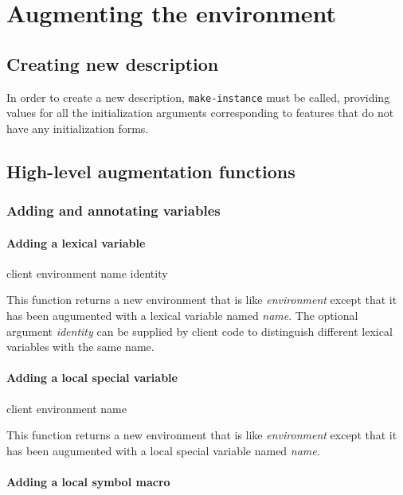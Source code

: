 \chapter{Augmenting the environment}

\section{Creating new description}

In order to create a new description, \texttt{make-instance}
must be called, providing values for all the initialization arguments
corresponding to features that do not have any initialization forms.


\section{High-level augmentation functions}
\label{sec-high-level-augmentation-functions}

\subsection{Adding and annotating variables}

\subsubsection{Adding a lexical variable}

{\footnotesize
{} {client environment name \optional identity}
}

This function returns a new environment that is like
\textit{environment} except that it has been augumented with a lexical
variable named \textit{name}.  The optional argument \textit{identity}
can be supplied by client code to distinguish different lexical
variables with the same name.

\subsubsection{Adding a local special variable}

{\footnotesize
{} {client environment name}
}

This function returns a new environment that is like
\textit{environment} except that it has been augumented with a local
special variable named \textit{name}.

\subsubsection{Adding a local symbol macro}

